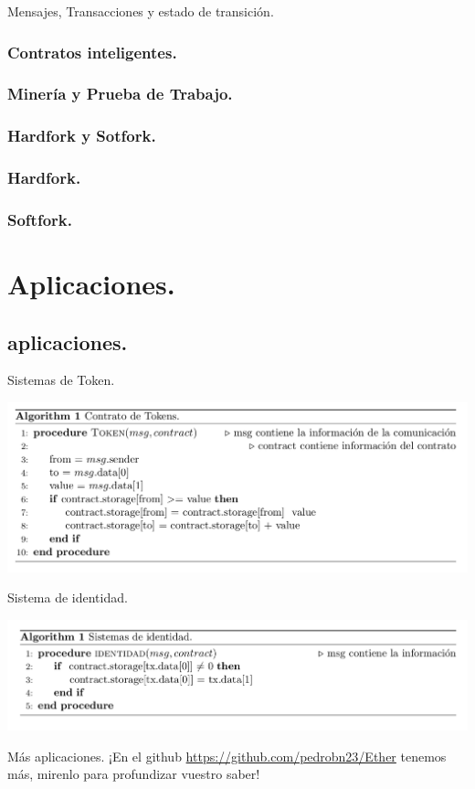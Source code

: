 \documentclass[usenames,dvipsnames]{beamer}
\begin{document}
\begin{frame}{ Mensajes, Transacciones y estado de transición. }

\end{frame}
\subsubsection{ Contratos inteligentes. }
\subsubsection{ Minería y Prueba de Trabajo. }
\subsubsection{ Hardfork y Sotfork. }
\subsubsection{ Hardfork. }
\subsubsection{ Softfork. }

\section { Aplicaciones. }
\subsection{aplicaciones. }

\begin{frame}{ Sistemas de Token. }
	
\includegraphics[width=\textwidth]{./images/alg1.png}
\end{frame}
\begin{frame}{ Sistema de identidad. }

\includegraphics[width=\textwidth]{./images/alg2.png}
\end{frame}
\begin{frame}{ Más aplicaciones. }
	¡En el github \url{https://github.com/pedrobn23/Ether} tenemos más, mirenlo para profundizar vuestro saber!
\end{frame}
\end{document}
